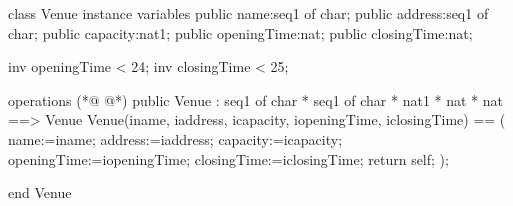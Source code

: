 \begin{vdmpp}[breaklines=true]
class Venue
instance variables
 public name:seq1 of char;
  public address:seq1 of char;
  public capacity:nat1;
  public openingTime:nat;
  public closingTime:nat;
  
  inv openingTime < 24;
  inv closingTime < 25;

operations
(*@
\label{Venue:13}
@*)
  public  Venue : seq1 of char * seq1 of char * nat1 * nat * nat  ==> Venue
  Venue(iname, iaddress, icapacity, iopeningTime, iclosingTime) == (
   name:=iname;
   address:=iaddress;
   capacity:=icapacity;
   openingTime:=iopeningTime;
   closingTime:=iclosingTime;
   return self;
  );

end Venue
\end{vdmpp}
